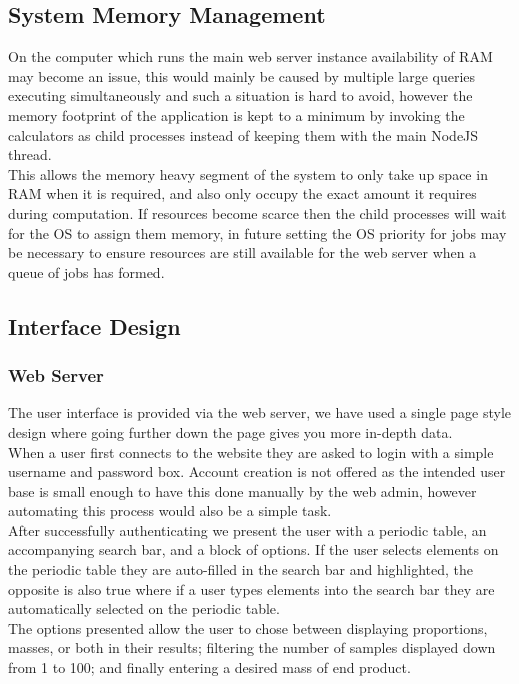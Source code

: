 \subsection{System Memory Management}
On the computer which runs the main web server instance availability of RAM may become an issue, this would mainly be caused by multiple large queries executing simultaneously and such a situation is hard to avoid, however the memory footprint of the application is kept to a minimum by invoking the calculators as child processes instead of keeping them with the main NodeJS thread.\\

This allows the memory heavy segment of the system to only take up space in RAM when it is required, and also only occupy the exact amount it requires during computation. If resources become scarce then the child processes will wait for the OS to assign them memory, in future setting the OS priority for jobs may be necessary to ensure resources are still available for the web server when a queue of jobs has formed.

\subsection{Interface Design}
\subsubsection{Web Server}
The user interface is provided via the web server, we have used a single page style design where going further down the page gives you more in-depth data. \\

When a user first connects to the website they are asked to login with a simple username and password box. Account creation is not offered as the intended user base is small enough to have this done manually by the web admin, however automating this process would also be a simple task.  \\

After successfully authenticating we present the user with a periodic table, an accompanying search bar, and a block of options. If the user selects elements on the periodic table they are auto-filled in the search bar and highlighted, the opposite is also true where if a user types elements into the search bar they are automatically selected on the periodic table. \\

The options presented allow the user to chose between displaying proportions, masses, or both in their results; filtering the number of samples displayed down from 1 to 100; and finally entering a desired mass of end product. \\

